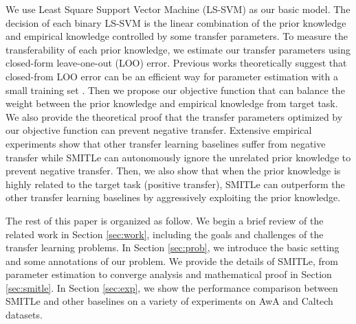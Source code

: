 We use Least Square Support Vector Machine (LS-SVM) \cite{suykens1999least} as our basic model. The decision of each binary LS-SVM is the linear combination of the prior knowledge and empirical knowledge controlled by some transfer parameters. To measure the transferability of each prior knowledge, we estimate our transfer parameters using closed-form leave-one-out (LOO) error. Previous works theoretically suggest that closed-from LOO error can be an efficient way for parameter estimation with a small training set \cite{kuzborskij2013stability} \cite{cawley2006leave}. Then we propose our objective function that can balance the weight between the prior knowledge and empirical knowledge from target task. We also provide the theoretical proof that the transfer parameters optimized by our objective function can prevent negative transfer. Extensive empirical experiments show that other transfer learning baselines suffer from negative transfer while SMITLe can autonomously ignore the unrelated prior knowledge to prevent negative transfer. Then, we also show that when the prior knowledge is highly related to the target task (positive transfer), SMITLe can outperform the other transfer learning baselines by aggressively exploiting the prior knowledge.

The rest of this paper is organized as follow. We begin a brief review of the related work in Section \ref{sec:work}, including the goals and challenges of the transfer learning problems. In Section \ref{sec:prob}, we introduce the basic setting and some annotations of our problem. We provide the details of SMITLe, from parameter estimation to converge analysis and mathematical proof in Section \ref{sec:smitle}. In Section \ref{sec:exp}, we show the performance comparison between SMITLe and other baselines on a variety of experiments on AwA and Caltech datasets.
  


